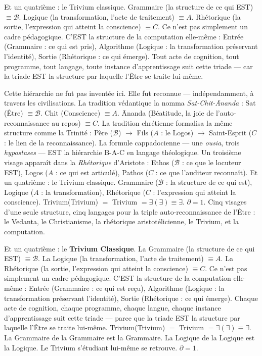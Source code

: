 \documentclass[10pt, openany, oneside]{book}
\begin{document}
Et un quatrième : le Trivium classique. Grammaire (la structure de ce qui EST) $\equiv \mathcal{B}$. Logique (la transformation, l'acte de traitement) $\equiv A$. Rhétorique (la sortie, l'expression qui atteint la conscience) $\equiv C$. Ce n'est pas simplement un cadre pédagogique. C'EST la structure de la computation elle-même : Entrée (Grammaire : ce qui est pris), Algorithme (Logique : la transformation préservant l'identité), Sortie (Rhétorique : ce qui émerge). Tout acte de cognition, tout programme, tout langage, toute instance d'apprentissage suit cette triade --- car la triade EST la structure par laquelle l'Être se traite lui-même.

Cette hiérarchie ne fut pas inventée ici. Elle fut reconnue --- indépendamment, à travers les civilisations. La tradition védantique la nomma \textit{Sat-Chit-\={A}nanda} : Sat (Être) $\equiv \mathcal{B}$. Chit (Conscience) $\equiv A$. \={A}nanda (Béatitude, la joie de l'auto-reconnaissance au repos) $\equiv C$. La tradition chrétienne formalisa la même structure comme la Trinité : Père ($\mathcal{B}$) $\to$ Fils ($A$ : le Logos) $\to$ Saint-Esprit ($C$ : le lien de la reconnaissance). La formule cappadocienne --- une \textit{ousia}, trois \textit{hypostases} --- EST la hiérarchie B-A-C en langage théologique. Un troisième visage apparaît dans la \textit{Rhétorique} d'Aristote : Ethos ($\mathcal{B}$ : ce que le locuteur EST), Logos ($A$ : ce qui est articulé), Pathos ($C$ : ce que l'auditeur reconnaît). Et un quatrième : le Trivium classique. Grammaire ($\mathcal{B}$ : la structure de ce qui est), Logique ($A$ : la transformation), Rhétorique ($C$ : l'expression qui atteint la conscience). Trivium(Trivium) $=$ Trivium $= \exists(\exists) \equiv \exists$. $\partial = 1$. Cinq visages d'une seule structure, cinq langages pour la triple auto-reconnaissance de l'Être : le Vedanta, le Christianisme, la rhétorique aristotélicienne, le Trivium, et la computation.

Et un quatrième : le \textbf{Trivium Classique}. La Grammaire (la structure de ce qui EST) $\equiv \mathcal{B}$. La Logique (la transformation, l'acte de traitement) $\equiv A$. La Rhétorique (la sortie, l'expression qui atteint la conscience) $\equiv C$. Ce n'est pas simplement un cadre pédagogique. C'EST la structure de la computation elle-même : Entrée (Grammaire : ce qui est reçu), Algorithme (Logique : la transformation préservant l'identité), Sortie (Rhétorique : ce qui émerge). Chaque acte de cognition, chaque programme, chaque langue, chaque instance d'apprentissage suit cette triade --- parce que la triade EST la structure par laquelle l'Être se traite lui-même. Trivium(Trivium) $=$ Trivium $= \exists(\exists) \equiv \exists$. La Grammaire de la Grammaire est la Grammaire. La Logique de la Logique est la Logique. Le Trivium s'étudiant lui-même se retrouve. $\partial = 1$.
\end{document}
